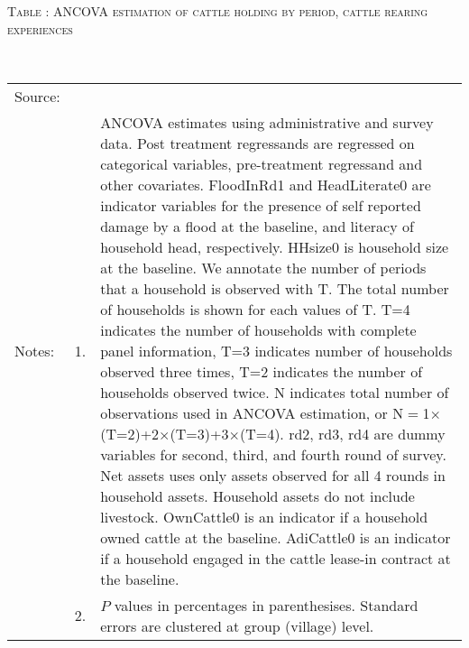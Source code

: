 \vspace{-1cm}\hspace{-1cm}\begin{minipage}[t]{14cm}
\hfil\textsc{\normalsize Table \thetable: ANCOVA estimation of cattle holding by period, cattle rearing experiences\label{tab ANCOVA NumCows Experience timevarying}}\\
\setlength{\tabcolsep}{1pt}
\setlength{\baselineskip}{8pt}
\renewcommand{\arraystretch}{.52}
\hfil{}\\
\renewcommand{\arraystretch}{.8}
\setlength{\tabcolsep}{1pt}
\begin{tabular}{>{\hfill\scriptsize}p{1cm}<{}>{\hfill\scriptsize}p{.25cm}<{}>{\scriptsize}p{12cm}<{\hfill}}
Source:& \multicolumn{2}{l}{\scriptsize Estimated with GUK administrative and survey data.}\\
Notes: & 1. & ANCOVA estimates using administrative and survey data. Post treatment regressands are regressed on categorical variables, pre-treatment regressand and other covariates. \textsf{FloodInRd1} and \textsf{HeadLiterate0} are indicator variables for the presence of self reported damage by a flood at the baseline, and literacy of household head, respectively. \textsf{HHsize0} is household size at the baseline. We annotate the number of periods that a household is observed with \textsf{T}. The total number of households is shown for each values of \textsf{T}. \textsf{T=4} indicates the number of households with complete panel information, \textsf{T=3} indicates number of households observed three times, \textsf{T=2} indicates the number of households observed twice. \textsf{N} indicates total number of observations used in ANCOVA estimation, or \textsf{N$=$1$\times$(T=2)+2$\times$(T=3)+3$\times$(T=4)}.  \textsf{rd2, rd3, rd4} are dummy variables for second, third, and fourth round of survey. Net assets uses only assets observed for all 4 rounds in household assets. Household assets do not include livestock. \textsf{OwnCattle0} is an indicator if a household owned cattle at the baseline. \textsf{AdiCattle0} is an indicator if a household engaged in the cattle lease-in contract at the baseline.  \\
& 2. & $P$ values in percentages in parenthesises. Standard errors are clustered at group (village) level.
\end{tabular}
\end{minipage}


